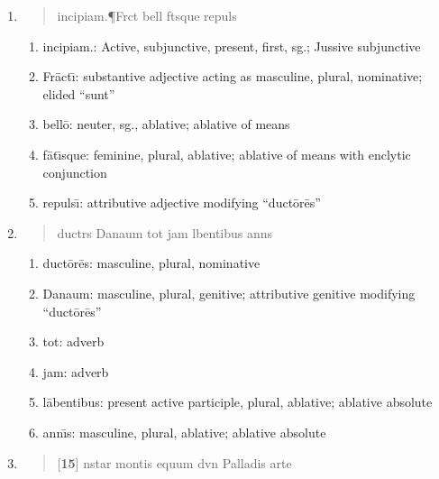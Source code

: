 \documentclass[]{article}
\newcommand{\latify}[1]{
        \Large
        \begin{verse}
          \begin{metrica}
          {#1}\\
          \end{metrica}
        \end{verse}
        \normalsize
}
\begin{document}
\begin{enumerate}
\begin{enumerate}
\end{enumerate}

\item \latify{incipiam.{\P}Fr{}ct{\macron {\i}} bell{\macron {o}} f{\macron {a}}t{\macron {\i}}sque repuls{\macron {\i}}}
\begin{enumerate}

	\item incipiam.:   Active, subjunctive, present, first, sg.; Jussive subjunctive

	\item Fr\={a}ct\={\i}:  substantive adjective acting as masculine, plural, nominative; elided ``sunt''

	\item bell\={o}:  neuter, sg., ablative; ablative of means

	\item f\={a}t\={\i}sque: feminine, plural, ablative; ablative of means with enclytic conjunction

	\item repuls\={\i}:  attributive adjective modifying ``duct\={o}r\={e}s''

\end{enumerate}

\item \latify{duct{}r{}s Danaum tot jam l{\macron {a}}bentibus ann{\macron {\i}}s}
\begin{enumerate}

	\item duct\={o}r\={e}s:  masculine, plural, nominative

	\item Danaum: masculine, plural, genitive; attributive genitive modifying ``duct\={o}r\={e}s''

	\item tot:  adverb

	\item jam: adverb

	\item l\={a}bentibus: present active participle, plural, ablative; ablative absolute

	\item ann\={\i}s:  masculine, plural, ablative; ablative absolute
\end{enumerate}


\item \latify{[\textbf{15}] {\macron {\i}}nstar montis equum d{\macron {\i}}v{\macron {\i}}n{\macron {a}} Palladis arte}     
\begin{enumerate}


\end{enumerate}
\end{enumerate}
\end{document}
